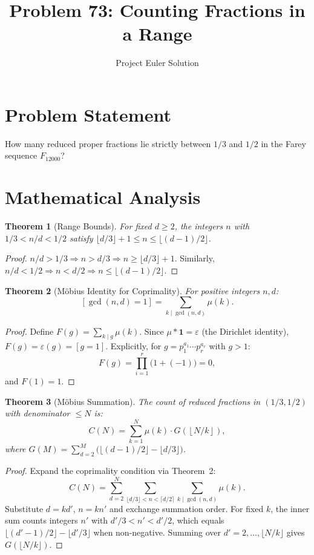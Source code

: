 \documentclass[12pt,a4paper]{article}
\title{Problem 73: Counting Fractions in a Range}
\author{Project Euler Solution}
\date{}
\newtheorem{theorem}{Theorem}
\begin{document}
\maketitle

\section{Problem Statement}

How many reduced proper fractions lie strictly between $1/3$ and $1/2$ in the Farey sequence $F_{12000}$?

\section{Mathematical Analysis}

\begin{theorem}[Range Bounds]
For fixed $d \geq 2$, the integers $n$ with $1/3 < n/d < 1/2$ satisfy $\lfloor d/3 \rfloor + 1 \leq n \leq \lfloor (d-1)/2 \rfloor$.
\end{theorem}

\begin{proof}
$n/d > 1/3 \Rightarrow n > d/3 \Rightarrow n \geq \lfloor d/3 \rfloor + 1$. Similarly, $n/d < 1/2 \Rightarrow n < d/2 \Rightarrow n \leq \lfloor (d-1)/2 \rfloor$.
\end{proof}

\begin{theorem}[M\"obius Identity for Coprimality]
For positive integers $n, d$:
\[
[\gcd(n,d) = 1] = \sum_{k \mid \gcd(n,d)} \mu(k).
\]
\end{theorem}

\begin{proof}
Define $F(g) = \sum_{k \mid g} \mu(k)$. Since $\mu * \mathbf{1} = \varepsilon$ (the Dirichlet identity), $F(g) = \varepsilon(g) = [g = 1]$. Explicitly, for $g = p_1^{a_1} \cdots p_r^{a_r}$ with $g > 1$:
\[
F(g) = \prod_{i=1}^{r}\bigl(1 + (-1)\bigr) = 0,
\]
and $F(1) = 1$.
\end{proof}

\begin{theorem}[M\"obius Summation]
The count of reduced fractions in $(1/3, 1/2)$ with denominator $\leq N$ is:
\[
C(N) = \sum_{k=1}^{N} \mu(k) \cdot G\!\left(\left\lfloor N/k \right\rfloor\right),
\]
where $G(M) = \sum_{d=2}^{M} \bigl(\lfloor (d-1)/2 \rfloor - \lfloor d/3 \rfloor\bigr)$.
\end{theorem}

\begin{proof}
Expand the coprimality condition via Theorem~2:
\[
C(N) = \sum_{d=2}^{N} \sum_{\lfloor d/3 \rfloor < n < \lceil d/2 \rceil} \sum_{k \mid \gcd(n,d)} \mu(k).
\]
Substitute $d = kd'$, $n = kn'$ and exchange summation order. For fixed $k$, the inner sum counts integers $n'$ with $d'/3 < n' < d'/2$, which equals $\lfloor (d'-1)/2 \rfloor - \lfloor d'/3 \rfloor$ when non-negative. Summing over $d' = 2, \ldots, \lfloor N/k \rfloor$ gives $G(\lfloor N/k \rfloor)$.
\end{proof}
\end{document}
